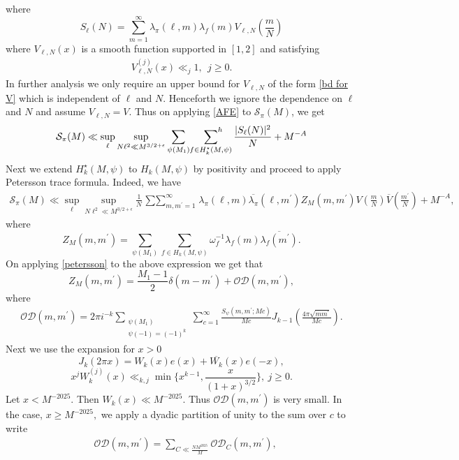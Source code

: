 \documentclass[12pt,a4paper,twoside, reqno]{amsart}
\begin{document}
where 
\[S_\ell(N)=\sum_{m=1}^\infty \lambda_\pi(\ell,m) \lambda_f(m)V_{\ell,N}\left(\frac{m}{N}\right)\]
where $V_{\ell, N}(x)$ is a smooth function supported in  $[1,2] $ and satisfying 
\begin{align}\label{bd for V}
     V_{\ell,N}^{(j)}(x) \ll_j 1, \ \ j \geq 0.
\end{align}
In further analysis we only require an upper bound for $V_{\ell,N}$  of the form  \eqref{bd for V} which is independent of $\ell$ and $N$. Henceforth we  ignore the dependence
on $\ell$ and $N$ and assume $V_{\ell,N}=V$.  Thus on applying \eqref{AFE} to $\mathcal{S}_\pi(M)$, we get 
\begin{align}
    \mathcal{S}_\pi(M) \ll \sup_\ell \sup_{N\ell^2 \ll M^{3/2+\epsilon}} \sum_{\psi(M_1)}\,  \sideset{}{^h} \sum_{f \in H_k^{\star}(M, \psi)}\frac{|S_\ell(N)|^2}{N}+M^{-A}
\end{align}
Next we extend $H_k^{\star}(M, \psi)$ to $H_k(M, \psi)$  by positivity and proceed to apply Petersson trace formula. Indeed, we have 
\begin{align}\label{after peter}
    \mathcal{S}_\pi(M) \ll \sup_\ell \sup_{N\ell^2 \ll M^{3/2+\epsilon}} \frac{1}{N}  \mathop{\sum\sum}_{m,m^\prime=1}^\infty \lambda_\pi (\ell, m) \overline{\lambda_{\pi}}(\ell,m^\prime) Z_{M}(m,m^\prime)V\left(\frac{m}{N}\right)\overline{V}\left(\frac{m^\prime}{N}\right) +M^{-A},
\end{align}
where 
\[Z_M(m,m^\prime)=  \sum_{\psi(M_1)}\sum_{f \in H_k^{}(M, \psi)}\omega_f^{-1}  \lambda_f(m) \overline{\lambda_f(m^\prime)}.\]
On applying \eqref{petersson} to the above expression we get that 
\[Z_M(m,m^\prime)= \frac{M_1-1}{2} \delta(m-m^\prime)+\mathcal{O}\mathcal{D}(m,m^\prime),\]
where
\begin{align*}
    \mathcal{O}\mathcal{D}(m,m^\prime)= 2 \pi i^{-k} \mathop{\sum}_{ \substack{\psi(M_1) \\ \psi(-1)=(-1)^k}}
\sum_{c=1}^\infty  \frac{S_\psi(m,m^\prime;Mc)}{Mc} J_{k-1}\left( \frac{4\pi \sqrt{mm^\prime}}{Mc}\right).
\end{align*}
Next we use the expansion for $x>0$
\[J_k(2\pi x)=W_k(x)e(x)+\overline{W_k}(x)e(-x),  \] 
\[x^jW_k^{(j)}(x)\ll_{k,j}  \min\{x^{k-1}, \frac{x}{(1+x)^{3/2} }\}, \ j \geq 0. \]
Let $x<M^{-2025}.$ Then  $W_k(x) \ll  M^{-2025}$. Thus $ \mathcal{O}\mathcal{D}(m,m^\prime)$ is very small. In the case, $ x\geq M^{-2025},$ 
 we apply a dyadic partition of unity to the sum over $c$ to write
\begin{align*}
    &\mathcal{O}\mathcal{D}(m, m^\prime)=\sum_{C \ll \frac{NM^{2025}}{M}} {\mathcal{O}\mathcal{D}}_C(m, m^\prime),
\end{align*}
\end{document}
